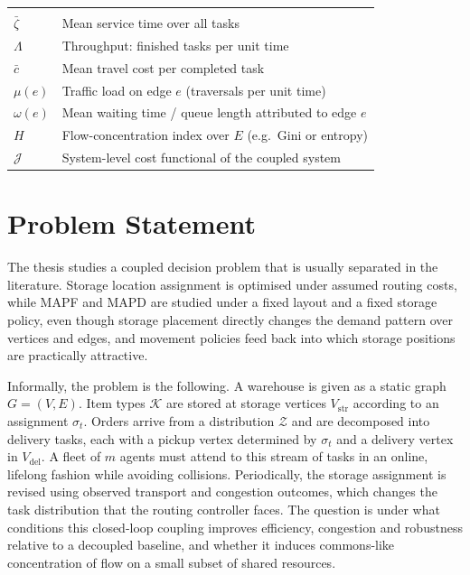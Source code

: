 \begin{table}[htbp]
\begin{tabular}{@{}ll@{}}
\addlinespace
\multicolumn{2}{@{}l}{\textit{Metrics}}\\
\( \bar{\zeta} \)           & Mean service time over all tasks \\
\( \Lambda \)               & Throughput: finished tasks per unit time \\
\( \bar{c} \)               & Mean travel cost per completed task \\
\( \mu(e) \)                & Traffic load on edge \( e \) (traversals per unit time) \\
\( \omega(e) \)             & Mean waiting time / queue length attributed to edge \( e \) \\
\( H \)                     & Flow-concentration index over \( E \) (e.g.\ Gini or entropy) \\
\( \mathcal{J} \)           & System-level cost functional of the coupled system \\
\bottomrule
\end{tabular}
\end{table}

\section{Problem Statement}

The thesis studies a coupled decision problem that is usually separated in
the literature. Storage location assignment is optimised under assumed
routing costs, while MAPF and MAPD are studied under a fixed layout and a
fixed storage policy, even though storage placement directly changes the
demand pattern over vertices and edges, and movement policies feed back into
which storage positions are practically attractive.

Informally, the problem is the following. A warehouse is given as a static
graph \( G = (V, E) \). Item types \( \mathcal{K} \) are stored at storage
vertices \( V_{\mathrm{str}} \) according to an assignment \( \sigma_t \).
Orders arrive from a distribution \( \mathcal{Z} \) and are decomposed into
delivery tasks, each with a pickup vertex determined by \( \sigma_t \) and a
delivery vertex in \( V_{\mathrm{del}} \). A fleet of \( m \) agents must
attend to this stream of tasks in an online, lifelong fashion while avoiding
collisions. Periodically, the storage assignment is revised using observed
transport and congestion outcomes, which changes the task distribution that
the routing controller faces. The question is under what conditions this
closed-loop coupling improves efficiency, congestion and robustness relative
to a decoupled baseline, and whether it induces commons-like concentration
of flow on a small subset of shared resources.


